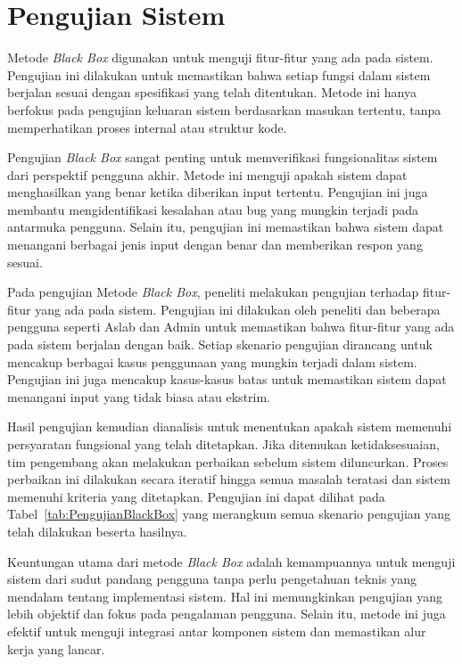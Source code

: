 \section{Pengujian Sistem}
Metode \textit{Black Box} digunakan untuk menguji fitur-fitur yang ada pada sistem. Pengujian ini dilakukan untuk memastikan bahwa setiap fungsi dalam sistem berjalan sesuai dengan spesifikasi yang telah ditentukan. Metode ini hanya berfokus pada pengujian keluaran sistem berdasarkan masukan tertentu, tanpa memperhatikan proses internal atau struktur kode.

Pengujian \textit{Black Box} sangat penting untuk memverifikasi fungsionalitas sistem dari perspektif pengguna akhir. Metode ini menguji apakah sistem dapat menghasilkan  yang benar ketika diberikan input tertentu. Pengujian ini juga membantu mengidentifikasi kesalahan atau bug yang mungkin terjadi pada antarmuka pengguna. Selain itu, pengujian ini memastikan bahwa sistem dapat menangani berbagai jenis input dengan benar dan memberikan respon yang sesuai.

Pada pengujian Metode \textit{Black Box}, peneliti melakukan pengujian terhadap fitur-fitur yang ada pada sistem. Pengujian ini dilakukan oleh peneliti dan beberapa pengguna seperti Aslab dan Admin untuk memastikan bahwa fitur-fitur yang ada pada sistem berjalan dengan baik. Setiap skenario pengujian dirancang untuk mencakup berbagai kasus penggunaan yang mungkin terjadi dalam sistem. Pengujian ini juga mencakup kasus-kasus batas untuk memastikan sistem dapat menangani input yang tidak biasa atau ekstrim.

Hasil pengujian kemudian dianalisis untuk menentukan apakah sistem memenuhi persyaratan fungsional yang telah ditetapkan. Jika ditemukan ketidaksesuaian, tim pengembang akan melakukan perbaikan sebelum sistem diluncurkan. Proses perbaikan ini dilakukan secara iteratif hingga semua masalah teratasi dan sistem memenuhi kriteria yang ditetapkan. Pengujian ini dapat dilihat pada Tabel~\ref{tab:PengujianBlackBox} yang merangkum semua skenario pengujian yang telah dilakukan beserta hasilnya.

Keuntungan utama dari metode \textit{Black Box} adalah kemampuannya untuk menguji sistem dari sudut pandang pengguna tanpa perlu pengetahuan teknis yang mendalam tentang implementasi sistem. Hal ini memungkinkan pengujian yang lebih objektif dan fokus pada pengalaman pengguna. Selain itu, metode ini juga efektif untuk menguji integrasi antar komponen sistem dan memastikan alur kerja yang lancar.

